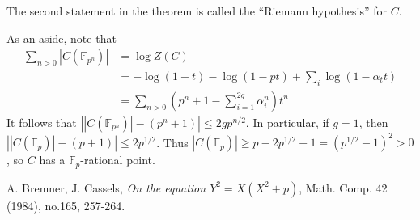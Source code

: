 \documentclass{article}
\theoremstyle{definition}
\begin{document}
The second statement in the theorem is called the ``Riemann hypothesis'' for 
$C$. 

As an aside, note that 
\begin{align*}
  \sum_{n>0} |C(\mathbb{F}_{p^n})| &= 
  \log Z(C) \\
    &= -\log(1-t) - \log(1-p t) + \sum_i \log(1-\alpha_t t) \\
    &= \sum_{n>0} \left(p^n+1-\sum_{i=1}^{2 g} \alpha_i^n\right) t^n
\end{align*}
It follows that 
$\left||C(\mathbb{F}_{p^n})|-(p^n+1)\right| \leqslant 2 g p^{n/2}$. In 
particular, if $g=1$, then 
$\left| |C(\mathbb{F}_p)|-(p+1)\right| \leqslant 2 p^{1/2}$. Thus 
$|C(\mathbb{F}_p)| \geqslant p-2 p^{1/2}+1 = (p^{1/2}-1)^2>0$, so 
$C$ has a $\mathbb{F}_p$-rational point. 











\begin{thebibliography}{9}
   A. Bremner, J. Cassels, \emph{On the equation $Y^2=X(X^2+p)$}, Math. Comp. 42 (1984), no.165, 257-264. 
\end{thebibliography}
\end{document}
